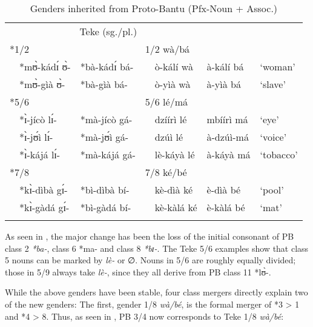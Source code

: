 \documentclass[output=paper,,modfonts,nonflat]{langsci/langscibook}
\begin{document}
\begin{table}
\caption{Genders inherited from Proto-Bantu (Pfx-Noun + Assoc.)}
\label{table6}
\begin{small}
\begin{tabular}{l		l l l  		l		l		l}
  \lsptoprule
\multicolumn{3}{c}{PB (sg./pl.)}					&	\multicolumn{4}{c}{Teke (sg./pl.)}	\\	
\cmidrule(r){1-3}\cmidrule(l){4-7}
\multicolumn{2}{l}{*1/2}			     &		&	\multicolumn{2}{l}{1/2 wà/bá}			&		&		\\	
	&	*mʊ̀-kádɪ́ ʊ̀-	&	*bà-kádɪ́ bá-	 &		&	ò-kálí wà	&	à-kálí bá	&	`woman’	\\	
	&	*mʊ̀-gìà ʊ̀-	&	*bà-gìà bá-	&		&	ò-yìà wà	&	à-yìà bá	&	`slave’	\\	[0.2cm]
\multicolumn{2}{l}{*5/6}			&		&	\multicolumn{2}{l}{5/6 lé/má}			&		&		\\	
	&	*ɪ̀-jícò lɪ́-	&	*mà-jícò gá-	&		&	dzíírì lé	&	mbíírì má	&	`eye’	\\	
	&	*ɪ̀-jʊ́ì lɪ́-	&	*mà-jʊ́ì gá-	&		&	dzúì lé	&	 à-dzúì-má &	`voice’	\\	
	&	*ɪ̀-kájá lɪ́-	&	*mà-kájá gá-	&		&	lè-káyà lé	&	à-káyà má	&	`tobacco’	\\	[0.2cm]
\multicolumn{2}{l}{*7/8}			&		&	\multicolumn{2}{l}{7/8 ké/bé}			&		&		\\	
	&	*kɪ̀-dìbà gɪ́-	&	*bì-dìbà bí-	&		&	kè-dìà ké	&	è-dìà bé	&	`pool’	\\	
	&	*kɪ̀-gàdá gɪ́-	&	*bì-gàdá bí-	&		&	kè-kàlá ké	&	è-kàlá bé	&	`mat’	\\	
  \lspbottomrule
\end{tabular}
\end{small}
\end{table}

As seen in , the major change has been the loss of the initial consonant of PB class 2 \textit{*ba-}, class 6 *ma- and class 8 \textit{*bɪ-}. The Teke 5/6 examples show that class 5 nouns can be marked by \textit{lè-} or ∅. Nouns in 5/6 are roughly equally divided; those in 5/9 always take \textit{lè-}, since they all derive from PB class 11 *lʊ̀-.

While the above genders have been stable, four class mergers directly explain two of the new genders: The first, gender 1/8 \textit{wà/bé}, is the formal merger of *3 > 1 and *4 > 8. Thus, as seen in , PB 3/4 now corresponds to Teke 1/8 \textit{wà/bé}:
\end{document}
